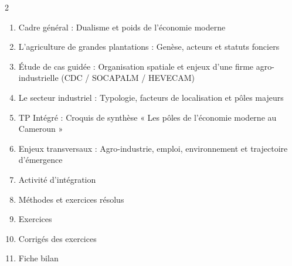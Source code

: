 \documentclass[11pt]{article}
\begin{document}
\begin{sommaire}
\begin{multicols}{2}
\begin{enumerate}
\item Cadre général : Dualisme et poids de l'économie moderne
\item L'agriculture de grandes plantations : Genèse, acteurs et statuts fonciers
\item Étude de cas guidée : Organisation spatiale et enjeux d'une firme agro-industrielle (CDC / SOCAPALM / HEVECAM)
\item Le secteur industriel : Typologie, facteurs de localisation et pôles majeurs
\item TP Intégré : Croquis de synthèse « Les pôles de l'économie moderne au Cameroun »
\item Enjeux transversaux : Agro-industrie, emploi, environnement et trajectoire d'émergence
\item Activité d'intégration
\item Méthodes et exercices résolus
\item Exercices
\item Corrigés des exercices
\item Fiche bilan
\end{enumerate}
\end{multicols}
\end{sommaire}
\end{document}
